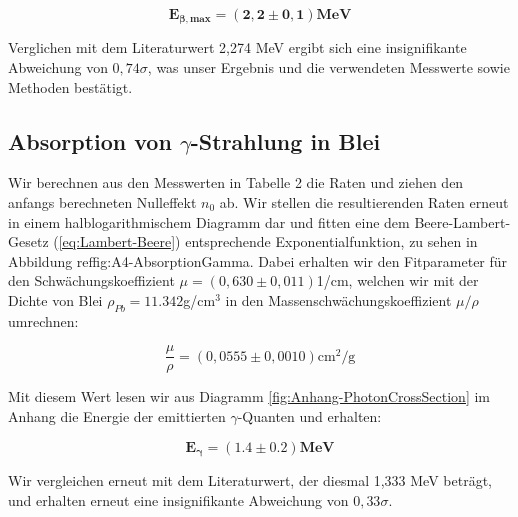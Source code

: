 \documentclass{article}
\begin{document}
\begin{equation}
    \bm{E_{\beta,max} = (2,2 \pm 0,1)} \textbf{MeV}
\end{equation}

Verglichen mit dem Literaturwert 2,274 MeV ergibt sich eine insignifikante Abweichung von $0,74\sigma$, was unser Ergebnis und die verwendeten Messwerte sowie Methoden bestätigt. 

\clearpage
\newpage

\subsection{Absorption von $\gamma$-Strahlung in Blei}

Wir berechnen aus den Messwerten in Tabelle 2 die Raten und ziehen den anfangs berechneten Nulleffekt $n_0$ ab. Wir stellen die resultierenden Raten erneut in einem halblogarithmischem Diagramm dar und fitten eine dem Beere-Lambert-Gesetz (\ref{eq:Lambert-Beere}) entsprechende Exponentialfunktion, zu sehen in Abbildung ref{fig:A4-AbsorptionGamma}. Dabei erhalten wir den Fitparameter für den Schwächungskoeffizient $\mu = (0,630 \pm 0,011)$1/cm, welchen wir mit der Dichte von Blei $\rho_{Pb} = 11.342$g/cm$^3$ in den Massenschwächungskoeffizient $\mu / \rho$ umrechnen:

\begin{equation}
    \frac{\mu}{\rho} = (0,0555 \pm 0,0010) \text{cm}^2 \text{/g}
\end{equation}

Mit diesem Wert lesen wir aus Diagramm \ref{fig:Anhang-PhotonCrossSection} im Anhang die Energie der emittierten $\gamma$-Quanten und erhalten:

\begin{equation}
    \bm{E_\gamma = (1.4 \pm 0.2)} \textbf{MeV}
\end{equation}

Wir vergleichen erneut mit dem Literaturwert, der diesmal 1,333 MeV beträgt, und erhalten erneut eine insignifikante Abweichung von $0,33\sigma$.
\end{document}
